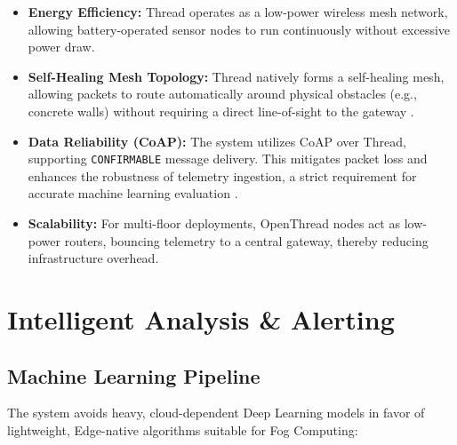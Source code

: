 \documentclass[10pt,a4paper]{article}
\begin{document}
\begin{itemize}
  \item \textbf{Energy Efficiency:} Thread operates as a low-power wireless mesh network,
    allowing battery-operated sensor nodes to run continuously without excessive power draw.
  \item \textbf{Self-Healing Mesh Topology:} Thread natively forms a self-healing mesh,
    allowing packets to route automatically around physical obstacles (e.g., concrete walls)
    without requiring a direct line-of-sight to the gateway \cite{khattak2023}.
  \item \textbf{Data Reliability (CoAP):} The system utilizes CoAP over Thread, supporting
    \texttt{CONFIRMABLE} message delivery. This mitigates packet loss and enhances the
    robustness of telemetry ingestion, a strict requirement for accurate machine learning
    evaluation \cite{coap2014}.
  \item \textbf{Scalability:} For multi-floor deployments, OpenThread nodes act as
    low-power routers, bouncing telemetry to a central gateway, thereby reducing
    infrastructure overhead.
\end{itemize}

\section{Intelligent Analysis \& Alerting}

\subsection{Machine Learning Pipeline}

The system avoids heavy, cloud-dependent Deep Learning models in favor of lightweight,
Edge-native algorithms suitable for Fog Computing:
\end{document}
